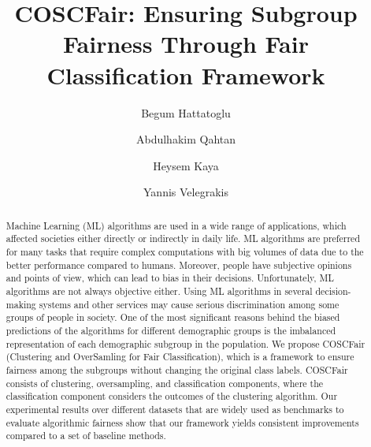 \documentclass[sigconf, nonacm]{acmart}
\begin{document}

\title{{COSCFair}: Ensuring Subgroup Fairness Through Fair Classification Framework}

\author{Begum Hattatoglu}

 
\author{Abdulhakim Qahtan}



\author{Heysem Kaya}



\author{Yannis Velegrakis}




\begin{abstract}

Machine Learning (ML) algorithms are used in a wide range of applications, which affected societies either directly or indirectly in daily life. ML algorithms are preferred for many tasks that require complex computations with big volumes of data due to the better performance compared to humans. Moreover, people have subjective opinions and points of view, which can lead to bias in their decisions. Unfortunately, ML algorithms are not always objective either. Using ML algorithms in several decision-making systems and other services may cause serious discrimination among some groups of people in society. One of the most significant reasons behind the biased predictions of the algorithms for different demographic groups is the imbalanced representation of each demographic subgroup in the population. We propose COSCFair (Clustering and OverSamling for Fair Classification), which is a framework to ensure fairness among the subgroups without changing the original class labels. COSCFair consists of clustering, oversampling, and classification components, where the classification component considers the outcomes of the clustering algorithm. Our experimental results over different datasets that are widely used as benchmarks to evaluate algorithmic fairness show that our framework yields consistent improvements compared to a set of baseline methods. 


\end{abstract}
\end{document}
